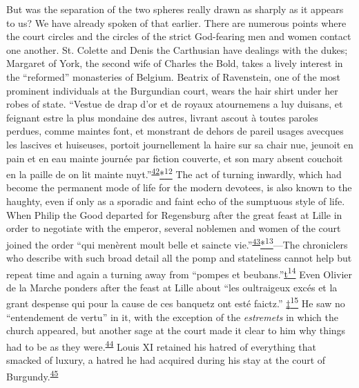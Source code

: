 But was the separation of the two spheres really drawn as sharply as it
appears to us? We have already spoken of that earlier. There are
numerous points where the court circles and the circles of the strict
God-fearing men and women contact one another. St. Colette and Denis the
Carthusian have dealings with the dukes; Margaret of York, the second
wife of Charles the Bold, takes a lively interest in the ``reformed''
monasteries of Belgium. Beatrix of Ravenstein, one of the most prominent
individuals at the Burgundian court, wears the hair shirt under her
robes of state. ``Vestue de drap d'or et de royaux atournemens a luy
duisans, et feignant estre la plus mondaine des autres, livrant ascout à
toutes paroles perdues, comme maintes font, et monstrant de dehors de
pareil usages avecques les lascives et huiseuses, portoit journellement
la haire sur sa chair nue, jeunoit en pain et en eau mainte journée par
fiction couverte, et son mary absent couchoit en la paille de on lit
mainte
nuyt.''\textsuperscript{\protect\hypertarget{20_ILLUSTRATIONS_FOLLOW_PAGE.xhtmlux5cux23id_389}{\protect\hyperlink{23_NOTES.xhtmlux5cux23id_390}{42}}}\protect\hypertarget{20_ILLUSTRATIONS_FOLLOW_PAGE.xhtmlux5cux23id_2675}{\protect\hyperlink{23_NOTES.xhtmlux5cux23id_2676}{*\textsuperscript{12}}}
The act of turning inwardly, which had become the
per\protect\hypertarget{20_ILLUSTRATIONS_FOLLOW_PAGE.xhtmlux5cux23page_315}{}{}manent
mode of life for the modern devotees, is also known to the haughty, even
if only as a sporadic and faint echo of the sumptuous style of life.
When Philip the Good departed for Regensburg after the great feast at
Lille in order to negotiate with the emperor, several noblemen and women
of the court joined the order ``qui menèrent moult belle et saincte
vie.''\textsuperscript{\protect\hypertarget{20_ILLUSTRATIONS_FOLLOW_PAGE.xhtmlux5cux23id_387}{\protect\hyperlink{23_NOTES.xhtmlux5cux23id_388}{43}}}\protect\hypertarget{20_ILLUSTRATIONS_FOLLOW_PAGE.xhtmlux5cux23id_2677}{\protect\hyperlink{23_NOTES.xhtmlux5cux23id_2678}{*\textsuperscript{13}}}---The
chroniclers who describe with such broad detail all the pomp and
stateliness cannot help but repeat time and again a turning away from
``pompes et
beubans.''\protect\hypertarget{20_ILLUSTRATIONS_FOLLOW_PAGE.xhtmlux5cux23id_2680}{\protect\hyperlink{23_NOTES.xhtmlux5cux23id_2679}{t\textsuperscript{14}}}
Even Olivier de la Marche ponders after the feast at Lille about ``les
oultraigeux excés et la grant despense qui pour la cause de ces banquetz
ont esté faictz.''
\protect\hypertarget{20_ILLUSTRATIONS_FOLLOW_PAGE.xhtmlux5cux23id_2681}{\protect\hyperlink{23_NOTES.xhtmlux5cux23id_2682}{‡\textsuperscript{15}}}
He saw no ``entendement de vertu'' in it, with the exception of the
\emph{estremets} in which the church appeared, but another sage at the
court made it clear to him why things had to be as they
were.\textsuperscript{\protect\hypertarget{20_ILLUSTRATIONS_FOLLOW_PAGE.xhtmlux5cux23id_385}{\protect\hyperlink{23_NOTES.xhtmlux5cux23id_386}{44}}}
Louis XI retained his hatred of everything that smacked of luxury, a
hatred he had acquired during his stay at the court of
Burgundy.\textsuperscript{\protect\hypertarget{20_ILLUSTRATIONS_FOLLOW_PAGE.xhtmlux5cux23id_383}{\protect\hyperlink{23_NOTES.xhtmlux5cux23id_384}{45}}}

